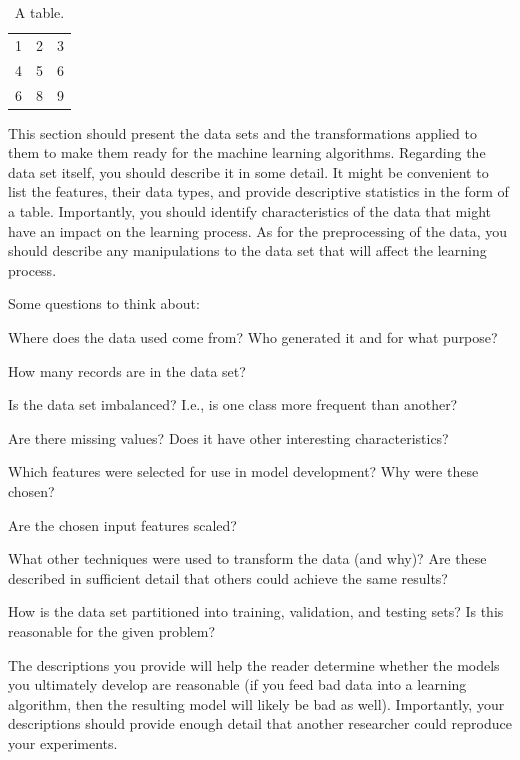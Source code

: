 \documentclass[jair,twoside,11pt,theapa]{article}
\begin{document}
\begin{table}
  \centering
  
  \begin{tabular}{ccc}\hline
  1 & 2 & 3 \\
  4 & 5 & 6 \\
  6 & 8 & 9 \\
  \hline
    \end{tabular}
  \caption{A table.}
  \label{tab1}
\end{table}



This section should present the data sets and the transformations applied to them to make them ready for the machine learning algorithms.
Regarding the data set itself, you should describe it in some detail. It might be convenient to list the features, their data types, and provide descriptive statistics in the form of a table. Importantly, you should identify characteristics of the data that might have an impact on the learning process.  As for the preprocessing of the data, you should describe any manipulations to the data set that will affect the learning process.

Some questions to think about:

{\color{blue}\begin{compactenum}
\item Where does the data used come from? Who generated it and for what purpose?
\item How many records are in the data set?
\item Is the data set imbalanced? I.e., is one class more frequent than another?
\item Are there missing values? Does it have other interesting characteristics?
\item Which features were selected for use in model development? Why were these chosen?
\item Are the chosen input features scaled?
\item What other techniques were used to transform the data (and why)? Are these described in sufficient detail that others could achieve the same results?
\item How is the data set partitioned into training, validation, and testing sets? Is this reasonable for the given problem?
\end{compactenum}}

The descriptions you provide will help the reader determine whether the models you ultimately develop are reasonable (if you feed bad data into a learning algorithm, then the resulting model will likely be bad as well). Importantly, your descriptions should provide enough detail that another researcher could reproduce your experiments.
\end{document}
